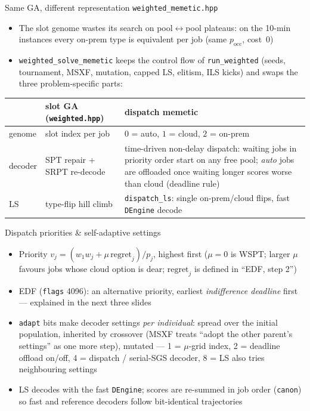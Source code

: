 \documentclass[aspectratio=169,t]{beamer}
\newcommand{\code}[1]{\texttt{#1}}
\begin{document}
\begin{frame}{Same GA, different representation \hfill{\small\code{weighted\_memetic.hpp}}}
  \begin{itemize}
    \item The slot genome wastes its search on \alert{pool$\leftrightarrow$pool
      plateaus}: on the 10-min instances every on-prem type is equivalent per
      job (same $p_{\text{occ}}$, cost~0)
    \item \code{weighted\_solve\_memetic} keeps the control flow of
      \code{run\_weighted} (seeds, tournament, MSXF, mutation, capped LS,
      elitism, ILS kicks) and swaps the three problem-specific parts:
  \end{itemize}
  \begin{center}
  \footnotesize
  \begin{tabular}{@{}p{1.6cm}p{4.6cm}p{6.6cm}@{}}
    \toprule
    & \textbf{slot GA} (\code{weighted.hpp}) & \textbf{dispatch memetic} \\
    \midrule
    genome  & slot index per job & $0$ = auto, $1$ = cloud, $2$ = on-prem \\
    decoder & SPT repair + SRPT re-decode & time-driven non-delay dispatch: waiting
              jobs in priority order start on any free pool; \emph{auto} jobs
              are offloaded once waiting longer scores worse than cloud
              (deadline rule) \\
    LS      & type-flip hill climb & \code{dispatch\_ls}: single on-prem/cloud
              flips, fast \code{DEngine} decode \\
    \bottomrule
  \end{tabular}
  \end{center}
\end{frame}

\begin{frame}{Dispatch priorities \& self-adaptive settings}
  \begin{itemize}
    \item Priority $v_j = (w_1 w_j + \mu\,\text{regret}_j)/p_j$, highest first
      ($\mu{=}0$ is WSPT; larger $\mu$ favours jobs whose cloud option is dear;
      $\text{regret}_j$ is defined in ``EDF, step 2'')
    \item \alert{EDF} (\code{flags} 4096): an alternative priority, earliest
      \emph{indifference deadline} first --- explained in the next three slides
    \item \code{adapt} bits make decoder settings \emph{per individual}:
      spread over the initial population, inherited by crossover (MSXF treats
      ``adopt the other parent's settings'' as one more step), mutated ---
      1 = $\mu$-grid index, 2 = deadline offload on/off, 4 = dispatch /
      serial-SGS decoder, 8 = LS also tries neighbouring settings
    \item LS decodes with the fast \code{DEngine}; scores are re-summed in job
      order (\code{canon}) so fast and reference decoders follow
      bit-identical trajectories
  \end{itemize}
\end{frame}
\end{document}
